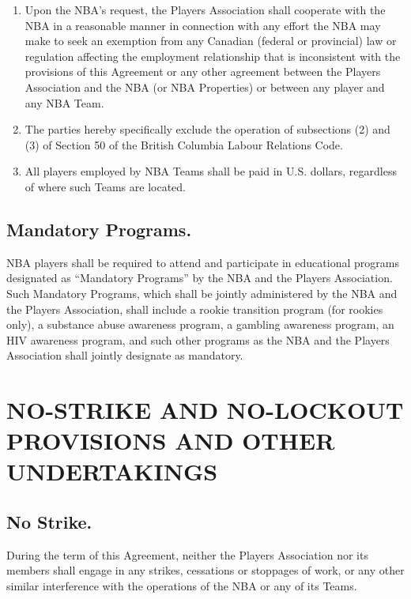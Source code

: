 \documentclass[
]{book}
\begin{document}
\begin{enumerate}
\item
  Upon the NBA's request, the Players Association shall cooperate with the NBA in a reasonable manner in connection with any effort the NBA may make to seek an exemption from any Canadian (federal or provincial) law or regulation affecting the employment relationship that is inconsistent with the provisions of this Agreement or any other agreement between the Players Association and the NBA (or NBA Properties) or between any player and any NBA Team.
\item
  The parties hereby specifically exclude the operation of subsections (2) and (3) of Section 50 of the British Columbia Labour Relations Code.
\item
  All players employed by NBA Teams shall be paid in U.S. dollars, regardless of where such Teams are located.
\end{enumerate}

\hypertarget{mandatory-programs.-1}{%
\section{Mandatory Programs.}\label{mandatory-programs.-1}}

NBA players shall be required to attend and participate in educational programs designated as ``Mandatory Programs'' by the NBA and the Players Association. Such Mandatory Programs, which shall be jointly administered by the NBA and the Players Association, shall include a rookie transition program (for rookies only), a substance abuse awareness program, a gambling awareness program, an HIV awareness program, and such other programs as the NBA and the Players Association shall jointly designate as mandatory.

\hypertarget{no-strike-and-no-lockout-provisions-and-other-undertakings}{%
\chapter{NO-STRIKE AND NO-LOCKOUT PROVISIONS AND OTHER UNDERTAKINGS}\label{no-strike-and-no-lockout-provisions-and-other-undertakings}}


\hypertarget{no-strike.}{%
\section{No Strike.}\label{no-strike.}}

During the term of this Agreement, neither the Players Association nor its members shall engage in any strikes, cessations or stoppages of work, or any other similar interference with the operations of the NBA or any of its Teams.
\end{document}
